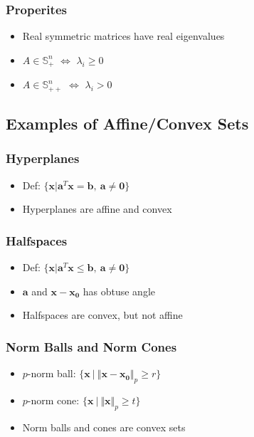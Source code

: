 \subsubsection*{Properites}
\begin{itemize}
    \item Real symmetric matrices have real eigenvalues
    \item $A \in \mathbb{S}^n_+$ $\Leftrightarrow$ $\lambda_i \geq 0$
    \item $A \in \mathbb{S}^n_{++}$ $\Leftrightarrow$ $\lambda_i > 0$
\end{itemize}

\subsection{Examples of Affine/Convex Sets}

\subsubsection*{Hyperplanes}
\begin{itemize}
    \item Def: $\{\mathbf{x}|\mathbf{a}^T\mathbf{x} = \mathbf{b},~\mathbf{a} \neq \mathbf{0}\}$
    \item Hyperplanes are affine and convex
\end{itemize}

\subsubsection*{Halfspaces}
\begin{itemize}
    \item Def: $\{\mathbf{x}|\mathbf{a}^T\mathbf{x} \leq \mathbf{b},~\mathbf{a}\neq\mathbf{0}\}$
    \item $\mathbf{a}$ and $\mathbf{x} - \mathbf{x_0}$ has obtuse angle
    \item Halfspaces are convex, but not affine
\end{itemize}

\subsubsection*{Norm Balls and Norm Cones}
\begin{itemize}
    \item $p$-norm ball: $\{\mathbf{x}~|~\Vert \mathbf{x} - \mathbf{x_0} \Vert_p \geq r\}$
    \item $p$-norm cone: $\{\mathbf{x}~|~\Vert \mathbf{x} \Vert_p \geq t\}$
    \item Norm balls and cones are convex sets
\end{itemize}

